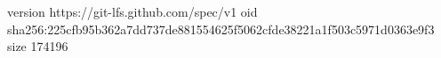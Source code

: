 version https://git-lfs.github.com/spec/v1
oid sha256:225cfb95b362a7dd737de881554625f5062cfde38221a1f503c5971d0363e9f3
size 174196
